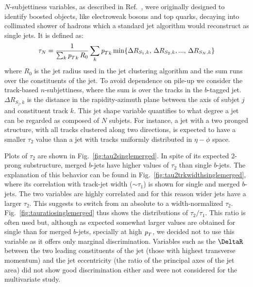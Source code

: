 $N$-subjettiness variables, as described in Ref.~\cite{nsubjettiness}, were originally designed to identify boosted objects, like electroweak bosons and top quarks, decaying into collimated shower of hadrons which a standard jet algorithm would reconstruct as single jets. It is defined as:
\begin{equation} 
\tau_N = \frac{1}{\sum_k {{\emph{p}_{T}}}_k\,R_0} \sum_k {{\emph{p}_{T}}}_k \min \{ \Delta R_{S_1,k},\,\Delta R_{S_2,k},...,\,\Delta R_{S_N,k} \}
\end{equation} 
where $R_0$ is the jet radius used in the jet clustering algorithm and the sum runs over the constituents of the jet. To avoid dependence on pile-up we consider the track-based $n$-subjettiness, where the sum 
 is over the tracks in the $b$-tagged jet. $\Delta R_{S_j,k} $ is the distance in the rapidity-azimuth plane between the axis of subjet $j$ and constituent track $k$. This jet shape variable quantifies to what degree a jet can be regarded as composed of $N$ subjets. For instance, a jet with a two pronged structure, with all tracks clustered along two directions, is expected to have a smaller $\tau_2$ value than a jet with tracks uniformly distributed in $\eta-\phi$ space.

Plots of $ \tau_2$ are shown in Fig.~\ref{fig:tau2singlemerged}. In spite of its expected 2-prong substructure, merged $b$-jets have higher values of $ \tau_2$ than single $b$-jets. The explanation of this behavior can be found in Fig.~\ref{fig:tau2trkwidthsinglemerged}, where its correlation with  track-jet width ($\sim \tau_1$) is shown for single and merged $b$-jets. The two variables are highly correlated and for this reason wider jets  have a larger $ \tau_2$. This suggests to switch from an absolute to a width-normalized
$\tau_2$. Fig.~\ref{fig:tauratiosinglemerged} thus shows the distributions of $\tau_2/\tau_1$. This ratio is often used but, although as expected somewhat larger values are obtained for single than for merged $b$-jets, specially at high ${\emph{p}_{T}}$, we decided not to use this variable as it offers only marginal discrimination. 
Variables such as the $\DeltaR$ between the two leading constituents of the jet (those with highest transverse momentum) and the jet eccentricity (the ratio of the principal axes of the jet area) did not show good discrimination either and were not considered for the multivariate study.

